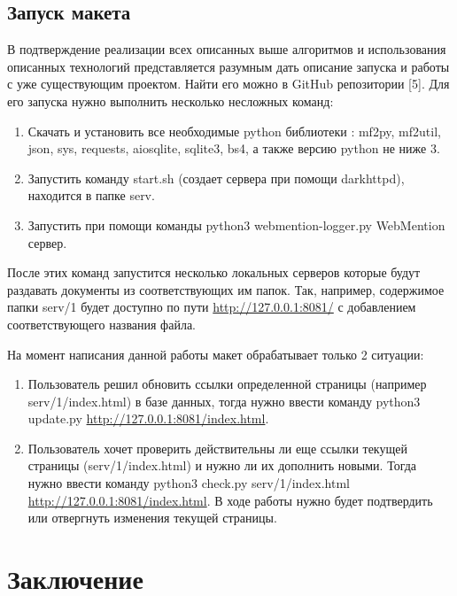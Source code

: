 \hypertarget{ux437ux430ux43fux443ux441ux43a-ux43cux430ux43aux435ux442ux430}{%
\subsection{Запуск
макета}\label{ux437ux430ux43fux443ux441ux43a-ux43cux430ux43aux435ux442ux430}}

В подтверждение реализации всех описанных выше алгоритмов и
использования описанных технологий представляется разумным дать описание
запуска и работы с уже существующим проектом. Найти его можно в GitHub
репозитории {[}5{]}. Для его запуска нужно выполнить несколько несложных
команд:

\begin{enumerate}
\def\labelenumi{\arabic{enumi}.}
\tightlist
\item
  Скачать и установить все необходимые python библиотеки : mf2py,
  mf2util, json, sys, requests, aiosqlite, sqlite3, bs4, а также версию
  python не ниже 3.
\item
  Запустить команду start.sh (создает сервера при помощи darkhttpd),
  находится в папке serv.
\item
  Запустить при помощи команды python3 webmention-logger.py WebMention
  сервер.
\end{enumerate}

После этих команд запустится несколько локальных серверов которые будут
раздавать документы из соответствующих им папок. Так, например,
содержимое папки serv/1 будет доступно по пути
\url{http://127.0.0.1:8081/} с добавлением соответствующего названия
файла.

На момент написания данной работы макет обрабатывает только 2 ситуации:

\begin{enumerate}
\def\labelenumi{\arabic{enumi}.}
\tightlist
\item
  Пользователь решил обновить ссылки определенной страницы (например
  serv/1/index.html) в базе данных, тогда нужно ввести команду python3
  update.py \url{http://127.0.0.1:8081/index.html}.
\item
  Пользователь хочет проверить действительны ли еще ссылки текущей
  страницы (serv/1/index.html) и нужно ли их дополнить новыми. Тогда
  нужно ввести команду python3 check.py serv/1/index.html
  \url{http://127.0.0.1:8081/index.html}. В ходе работы нужно будет
  подтвердить или отвергнуть изменения текущей страницы.
\end{enumerate}

\hypertarget{ux437ux430ux43aux43bux44eux447ux435ux43dux438ux435}{%
\section{Заключение}\label{ux437ux430ux43aux43bux44eux447ux435ux43dux438ux435}}

